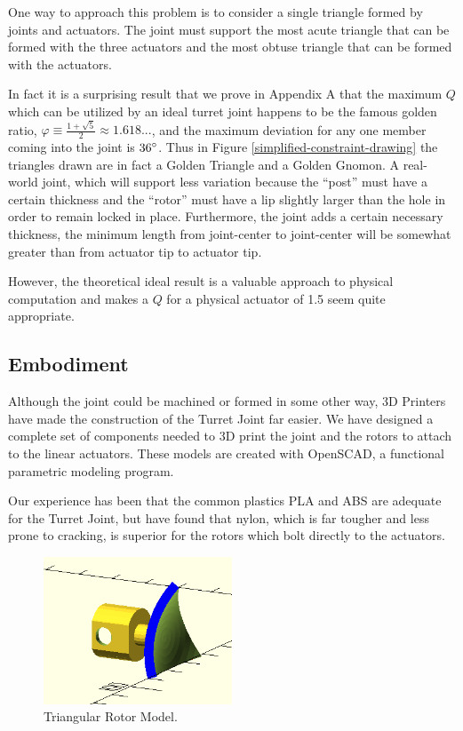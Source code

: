 \documentclass[11pt]{article}
\begin{document}
One way to approach this problem is to consider a single triangle formed by joints and actuators.
The joint must support the most acute triangle
that can be formed with the three actuators and the most obtuse triangle that can be formed with the actuators.

In fact it is a surprising result that we prove in Appendix A that the maximum $Q$ which can be utilized
by an ideal turret joint happens to be
the famous golden ratio, $\varphi \equiv \frac{1 + \sqrt{5}}{2} \approx 1.618...$, and the maximum deviation for any one member coming
into the joint is $36\degree$.
Thus in Figure \ref{simplified-constraint-drawing} the triangles drawn are in fact a Golden Triangle and a Golden Gnomon.
A real-world joint, which will support less variation because the ``post'' must have a
certain thickness and the ``rotor'' must have a lip
slightly larger than the hole in order to remain locked in place.
Furthermore, the joint adds a certain necessary thickness, the minimum length
 from joint-center to joint-center will be somewhat greater than from actuator tip to actuator tip.

 However, the theoretical ideal result is a valuable approach to physical computation and makes a $Q$ for a physical actuator of 1.5 seem quite appropriate.

 \subsection{Embodiment}

 Although the joint could be machined or formed in some other way,
 3D Printers have made the construction of the Turret Joint far easier.
 We have designed a complete set of components needed to 3D print the joint and the rotors to attach to
 the linear actuators. These models are created with OpenSCAD, a functional parametric modeling program.

 Our experience has been that the common plastics PLA and ABS are adequate for the Turret Joint,
 but have found that nylon, which is far tougher and less prone to cracking, is superior for the
 rotors which bolt directly to the actuators.

 \begin{figure}[H]
  \centering
    \includegraphics[width=0.5\textwidth]{figures/RotorModel.png}
    \caption[Triangular Rotor Model]{Triangular Rotor Model.}
      \label{rotormodel}
\end{figure}
\end{document}
